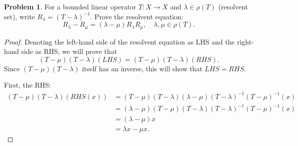 \documentclass[12pt]{article}
\theoremstyle{definition}
\newtheorem{ex}{Problem}
\begin{document}
\begin{ex}
	For a bounded linear operator $T: X \to X$ and $\lambda \in \rho(T)$ (resolvent set), write $R_\lambda = (T - \lambda)^{-1}$.
	Prove the resolvent equation: \begin{equation*}
		R_\lambda - R_\mu = (\lambda - \mu)R_\lambda R_\mu, \hspace{1em} \lambda, \mu \in \rho(T).
	\end{equation*}
\end{ex}
\begin{proof}
	Denoting the left-hand side of the resolvent equation as LHS and the right-hand side as RHS, we will prove that \begin{equation*}
		(T-\mu)(T-\lambda)(LHS) = (T-\mu)(T-\lambda)(RHS).
	\end{equation*}
	Since $(T-\mu)(T-\lambda)$ itself has an inverse, this will show that $LHS = RHS$.

	First, the RHS: \begin{align*}
		(T-\mu)(T-\lambda)(RHS(x)) & = (T-\mu)(T-\lambda)(\lambda - \mu)(T-\lambda)^{-1}(T-\mu)^{-1}(x) \\
		                           & = (\lambda - \mu)(T-\mu)(T-\lambda)(T-\lambda)^{-1}(T-\mu)^{-1}(x) \\
		                           & = (\lambda-\mu)x                                                   \\
		                           & = \lambda x - \mu x.
	\end{align*}


\end{proof}
\end{document}
